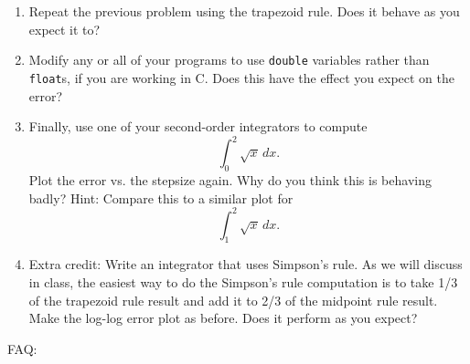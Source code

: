 \documentclass[12pt]{article}
\begin{document}
\begin{enumerate}
\item{Repeat the previous problem using the trapezoid rule. Does it behave as you expect it to?}

\item{Modify any or all of your programs to use {\tt double} variables rather than {\tt float}s, if you are working in C. Does this have the effect you expect on the error?}

\item{Finally, use one of your second-order integrators to compute $$\int_0^2 \sqrt{x}\,dx.$$ Plot the error vs. the stepsize again. Why do you think this is behaving badly?
  Hint: Compare this to a similar plot for $$\int_1^2 \sqrt{x}\,dx.$$}

\item{Extra credit: Write an integrator that uses Simpson's rule. As we will discuss in class, the easiest way to do the Simpson's rule computation is to take 1/3 of the trapezoid
  rule result and add it to 2/3 of the midpoint rule result. Make the log-log error plot as before. Does it perform as you expect?}
  \end{enumerate} 


FAQ:
\end{document}
